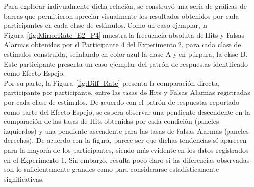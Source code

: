 Para explorar indivualmente dicha relación, se construyó una serie de gráficas de barras que permitieron apreciar visualmente los resultados obtenidos por cada participantes en cada clase de estímulos. Como un caso ejemplar, la Figura~\ref{fig:MirrorRate_E2_P4} muestra la frecuencia absoluta de Hits y Falsas Alarmas obtenidas por el Participante 4 del Experimento 2, para cada clase de estímulos construida, señalando en color azul la clase A y en púrpura, la clase B. Este participante presenta un caso ejemplar del patrón de respuestas identificado como Efecto Espejo.\\

Por su parte, la Figura~\ref{fig:Diff_Rate} presenta la comparación directa, participante por participante, entre las tasas de Hits y Falsas Alarmas registradas por cada clase de estímulos. De acuerdo con el patrón de respuestas reportado como parte del Efecto Espejo, se espera observar una pendiente descendente en la comparación de las tasas de Hits obtenidas por cada condición (paneles izquierdos) y una pendiente ascendente para las tasas de Falsas Alarmas (paneles derechos). De acuerdo con la figura, parece ser que dichas tendencias sí aparecen para la mayoría de los participantes, siendo más evidente en los datos registrados en el Experimento 1. Sin embargo, resulta poco claro si las diferencias observadas son lo suficientemente grandes como para considerarse estadísticamente significativas.\\


